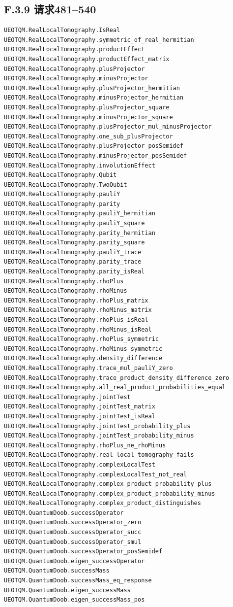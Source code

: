 \documentclass[
  11pt,
  oneside]{book}
\begin{document}
\subsection{F.3.9 请求481--540}

\begin{Verbatim}[breaklines,breakanywhere,fontsize=\scriptsize]
UEOTQM.RealLocalTomography.IsReal
UEOTQM.RealLocalTomography.symmetric_of_real_hermitian
UEOTQM.RealLocalTomography.productEffect
UEOTQM.RealLocalTomography.productEffect_matrix
UEOTQM.RealLocalTomography.plusProjector
UEOTQM.RealLocalTomography.minusProjector
UEOTQM.RealLocalTomography.plusProjector_hermitian
UEOTQM.RealLocalTomography.minusProjector_hermitian
UEOTQM.RealLocalTomography.plusProjector_square
UEOTQM.RealLocalTomography.minusProjector_square
UEOTQM.RealLocalTomography.plusProjector_mul_minusProjector
UEOTQM.RealLocalTomography.one_sub_plusProjector
UEOTQM.RealLocalTomography.plusProjector_posSemidef
UEOTQM.RealLocalTomography.minusProjector_posSemidef
UEOTQM.RealLocalTomography.involutionEffect
UEOTQM.RealLocalTomography.Qubit
UEOTQM.RealLocalTomography.TwoQubit
UEOTQM.RealLocalTomography.pauliY
UEOTQM.RealLocalTomography.parity
UEOTQM.RealLocalTomography.pauliY_hermitian
UEOTQM.RealLocalTomography.pauliY_square
UEOTQM.RealLocalTomography.parity_hermitian
UEOTQM.RealLocalTomography.parity_square
UEOTQM.RealLocalTomography.pauliY_trace
UEOTQM.RealLocalTomography.parity_trace
UEOTQM.RealLocalTomography.parity_isReal
UEOTQM.RealLocalTomography.rhoPlus
UEOTQM.RealLocalTomography.rhoMinus
UEOTQM.RealLocalTomography.rhoPlus_matrix
UEOTQM.RealLocalTomography.rhoMinus_matrix
UEOTQM.RealLocalTomography.rhoPlus_isReal
UEOTQM.RealLocalTomography.rhoMinus_isReal
UEOTQM.RealLocalTomography.rhoPlus_symmetric
UEOTQM.RealLocalTomography.rhoMinus_symmetric
UEOTQM.RealLocalTomography.density_difference
UEOTQM.RealLocalTomography.trace_mul_pauliY_zero
UEOTQM.RealLocalTomography.trace_product_density_difference_zero
UEOTQM.RealLocalTomography.all_real_product_probabilities_equal
UEOTQM.RealLocalTomography.jointTest
UEOTQM.RealLocalTomography.jointTest_matrix
UEOTQM.RealLocalTomography.jointTest_isReal
UEOTQM.RealLocalTomography.jointTest_probability_plus
UEOTQM.RealLocalTomography.jointTest_probability_minus
UEOTQM.RealLocalTomography.rhoPlus_ne_rhoMinus
UEOTQM.RealLocalTomography.real_local_tomography_fails
UEOTQM.RealLocalTomography.complexLocalTest
UEOTQM.RealLocalTomography.complexLocalTest_not_real
UEOTQM.RealLocalTomography.complex_product_probability_plus
UEOTQM.RealLocalTomography.complex_product_probability_minus
UEOTQM.RealLocalTomography.complex_product_distinguishes
UEOTQM.QuantumDoob.successOperator
UEOTQM.QuantumDoob.successOperator_zero
UEOTQM.QuantumDoob.successOperator_succ
UEOTQM.QuantumDoob.successOperator_smul
UEOTQM.QuantumDoob.successOperator_posSemidef
UEOTQM.QuantumDoob.eigen_successOperator
UEOTQM.QuantumDoob.successMass
UEOTQM.QuantumDoob.successMass_eq_response
UEOTQM.QuantumDoob.eigen_successMass
UEOTQM.QuantumDoob.eigen_successMass_pos
\end{Verbatim}
\end{document}
